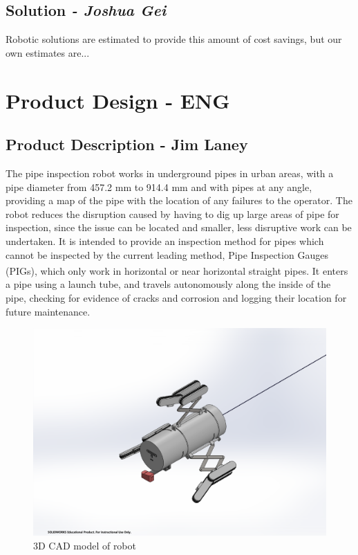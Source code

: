 \documentclass[11pt]{article}		%
\newlength{\imageheight}	 %
\newcommand{\supercite}[1]{\textsuperscript{\cite{#1}}}		%
\begin{document}
	\subsection[Solution]{Solution \textit{- Joshua Gei}}
	
	Robotic solutions are estimated to provide this amount of cost savings, but our own estimates are... 
	
	\section{Product Design - ENG}
	
	\subsection[Product Description]{Product Description - Jim Laney}
	
		The pipe inspection robot works in underground pipes in urban areas, with a pipe diameter from 457.2 mm to 914.4 mm and with pipes at any angle, providing a map of the pipe with the location of any failures to the operator. %
		The robot reduces the disruption caused by having to dig up large areas of pipe for inspection, since the issue can be located and smaller, less disruptive work can be undertaken.
		It is intended to provide an inspection method for pipes which cannot be inspected by the current leading method, Pipe Inspection Gauges (PIGs), which only work in horizontal or near horizontal straight pipes\supercite{mills2017advances}.
		It enters a pipe using a launch tube, and travels autonomously along the inside of the pipe, checking for evidence of cracks and corrosion and logging their location for future maintenance.
		\\
		
		\begin{figure}[h] %
			\centering
			\includegraphics[trim={6cm 2cm 7cm 4cm},clip,height=\imageheight]{overviewCAD}
			\caption{3D CAD model of robot}
			\label{3DSketch}
		\end{figure}
		
\end{document}
